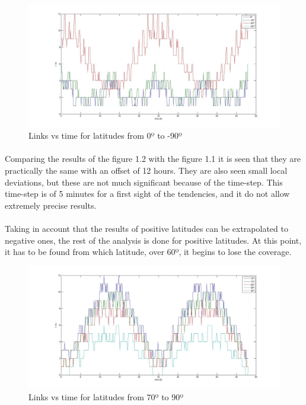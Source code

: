 \documentclass[12pt,a4paper]{report}
\begin{document}
\begin{figure}[H]
\begin{center}
\includegraphics[scale=0.30]{0_-30_-90_lat.jpg}
\caption{Links vs time for latitudes from 0º to -90º}
\end{center}
\end{figure}

\paragraph{}
Comparing the results of the figure 1.2 with the figure 1.1 it is seen that they are practically the same with an offset of 12 hours. They are also seen small local deviations, but these are not much significant because of the time-step. This time-step is of 5 minutes for a first sight of the tendencies, and it do not allow extremely precise results.
\paragraph{}
Taking in account that the results of positive latitudes can be extrapolated to negative ones, the rest of the analysis is done for positive latitudes. At this point, it has to be found from which latitude, over 60º, it begins to lose the coverage.

\begin{figure}[H]
\begin{center}
\includegraphics[scale=0.30]{70_5_90_lat.jpg}
\caption{Links vs time for latitudes from 70º to 90º}
\end{center}
\end{figure}
\end{document}
